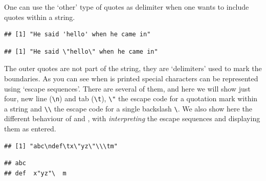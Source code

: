 \documentclass[krantz2]{krantz}\usepackage{knitr}%
\begin{document}
One can use the `other' type of quotes as delimiter when one wants to include quotes within a string.

\begin{knitrout}\footnotesize
{}\color{fgcolor}\begin{kframe}
\begin{alltt}
 \hlkwb{<-} 
\end{alltt}
\begin{verbatim}
## [1] "He said 'hello' when he came in"
\end{verbatim}
\begin{alltt}
 \hlkwb{<-} 
\end{alltt}
\begin{verbatim}
## [1] "He said \"hello\" when he came in"
\end{verbatim}
\end{kframe}
\end{knitrout}

The outer quotes are not part of the string, they are `delimiters' used to mark the boundaries. As you can see when  is printed special characters can be represented using `escape sequences'. There are several of them, and here we will show just four, new line (\verb|\n|) and tab (\verb|\t|), \verb|\"| the escape code for a quotation mark within a string and \verb|\\| the escape code for a single backslash \verb|\|. We also show here the different behaviour of  and , with  \emph{interpreting} the escape sequences and  displaying them as entered.

\begin{knitrout}\footnotesize
{}\color{fgcolor}\begin{kframe}
\begin{alltt}
 \hlkwb{<-} 
\end{alltt}
\begin{verbatim}
## [1] "abc\ndef\tx\"yz\"\\\tm"
\end{verbatim}
\begin{alltt}
\end{alltt}
\begin{verbatim}
## abc
## def	x"yz"\	m
\end{verbatim}
\end{kframe}
\end{knitrout}
\end{document}
